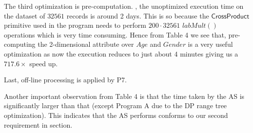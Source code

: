 
The third optimization is pre-computation. , the unoptimized execution time on the dataset of $32561$ records is around 2 days. This is so because the $\textsf{CrossProduct}$ primitive used in the program needs to perform $200\cdot 32561$ $labMult()$ operations which is very time consuming. Hence from Table 4 we see that, pre-computing the 2-dimensional attribute over $Age$ and $Gender$ is a very useful optimization as now the execution reduces to just about 4 minutes giving us a $717.6\times$ speed up. %

Last, off-line processing is applied by P7. 


Another important observation from Table 4 is that the time taken by the \textsf{AS} is significantly larger than that  (except Program A due to the DP range tree optimization). This indicates that the \textsf{AS} performs conforms to our second requirement in section.



